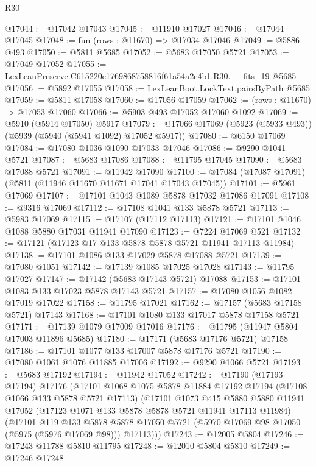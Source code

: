 \begin{lexlean}{R30}
\begin{coremodule}
@17044 := @17042 @17043
@17045 := @11910 @17027
@17046 := @17044 @17045
@17048 := fun (rows : @11670) => @17034 @17046
@17049 := @5886 @493
@17050 := @5811 @5685
@17052 := @5683 @17050 @5721
@17053 := @17049 @17052
@17055 := LexLeanPreserve.C615220e1769868758816f61a54a2e4b1.R30.__fits_19 @5685
@17056 := @5892 @17055
@17058 := LexLeanBoot.LockText.pairsByPath @5685
@17059 := @5811 @17058
@17060 := @17056 @17059
@17062 := (rows : @11670) -> @17053 @17060
@17066 := @5903 @493 @17052 @17060 @1092
@17069 := @5910 (@5914 @17050) @5917
@17079 := @17066 @17069 (@5923 (@5933 @493)) (@5939 (@5940 (@5941 @1092) @17052 @5917))
@17080 := @6150 @17069
@17084 := @17080 @1036 @1090 @17033 @17046
@17086 := @9290 @1041 @5721
@17087 := @5683 @17086
@17088 := @11795 @17045
@17090 := @5683 @17088 @5721
@17091 := @11942 @17090
@17100 := @17084 (@17087 @17091) (@5811 (@11946 @11670 @11671 @17041 @17043 @17045))
@17101 := @5961 @17069
@17107 := @17101 @1043 @1089 @5878 @17032 @17086 @17091
@17108 := @9316 @17069
@17112 := @17108 @1041 @133 @5878 @5721
@17113 := @5983 @17069
@17115 := @17107 (@17112 @17113)
@17121 := @17101 @1046 @1088 @5880 @17031 @11941 @17090
@17123 := @7224 @17069 @521
@17132 := @17121 (@17123 @17 @133 @5878 @5878 @5721 @11941 @17113 @11984)
@17138 := @17101 @1086 @133 @17029 @5878 @17088 @5721
@17139 := @17080 @1051
@17142 := @17139 @1085 @17025 @17028
@17143 := @11795 @17027
@17147 := @17142 (@5683 @17143 @5721) @17088
@17153 := @17101 @1083 @133 @17023 @5878 @17143 @5721
@17157 := @17080 @1056 @1082 @17019 @17022
@17158 := @11795 @17021
@17162 := @17157 (@5683 @17158 @5721) @17143
@17168 := @17101 @1080 @133 @17017 @5878 @17158 @5721
@17171 := @17139 @1079 @17009 @17016
@17176 := @11795 (@11947 @5804 @17003 @11896 @5685)
@17180 := @17171 (@5683 @17176 @5721) @17158
@17186 := @17101 @1077 @133 @17007 @5878 @17176 @5721
@17190 := @17080 @1061 @1076 @11885 @17006
@17192 := @9290 @1066 @5721
@17193 := @5683 @17192
@17194 := @11942 @17052
@17242 := @17190
    (@17193 @17194)
    @17176
    (@17101
      @1068
      @1075
      @5878
      @11884
      @17192
      @17194
      (@17108 @1066 @133 @5878 @5721 @17113)
      (@17101
        @1073
        @415
        @5880
        @5880
        @11941
        @17052
        (@17123 @1071 @133 @5878 @5878 @5721 @11941 @17113 @11984)
        (@17101
          @119
          @133
          @5878
          @5878
          @17050
          @5721
          (@5970 @17069 @98 @17050 (@5975 (@5976 @17069 @98)))
          @17113)))
@17243 := @12005 @5804
@17246 := @17243 @11788 @5810 @11795
@17248 := @12010 @5804 @5810
@17249 := @17246 @17248

\end{coremodule}
\end{lexlean}
